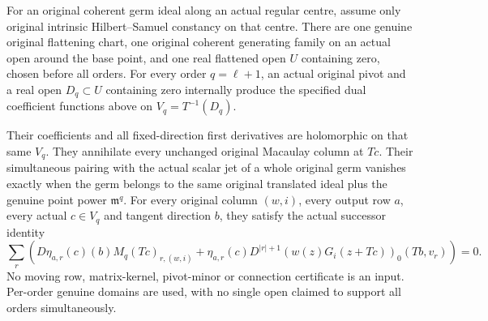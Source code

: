 \begin{theorem}
\label{hir:actual-original-hs-centre-dual-rows-successor-connection}
\leanok
For an original coherent germ ideal along an actual regular centre,
assume only original intrinsic Hilbert--Samuel constancy on that
centre. There are one genuine original flattening chart, one original
coherent generating family on an actual open around the base point,
and one real flattened open $U$ containing zero, chosen before all
orders. For every order $q=\ell+1$, an actual original pivot and a real
open $D_q\subset U$ containing zero internally produce the specified
dual coefficient functions above on $V_q=T^{-1}(D_q)$.

Their coefficients and all fixed-direction first derivatives are
holomorphic on that same $V_q$. They annihilate every unchanged
original Macaulay column at $Tc$. Their simultaneous pairing with the
actual scalar jet of a whole original germ vanishes exactly when the
germ belongs to the same original translated ideal plus the genuine
point power $\mathfrak m^q$. For every original column $(w,i)$,
every output row $a$, every actual $c\in V_q$ and tangent direction
$b$, they satisfy the actual successor identity
\[
 \sum_r\left(
 D\eta_{a,r}(c)(b)M_q(Tc)_{r,(w,i)}+
 \eta_{a,r}(c)D^{|r|+1}
 (w(z)G_i(z+Tc))_0(Tb,v_r)
 \right)=0.
\]
No moving row, matrix-kernel, pivot-minor or connection certificate is
an input. Per-order genuine domains are used, with no single open
claimed to support all orders simultaneously.
\end{theorem}
